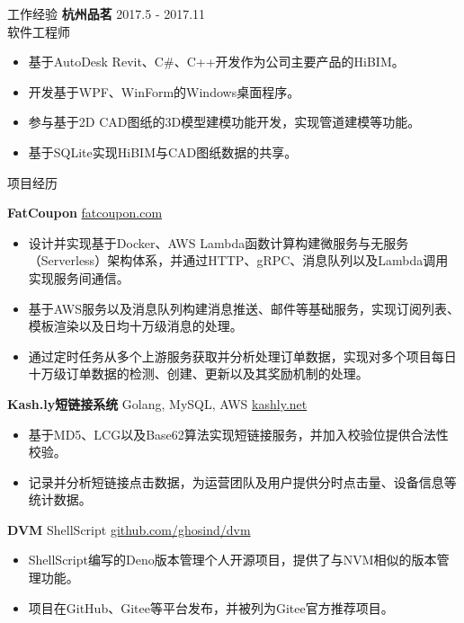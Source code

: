 \documentclass{resume} %
\begin{document}
\begin{rSection}{工作经验}
\textbf{杭州品茗} \hfill 2017.5 - 2017.11\\
软件工程师 \hfill \textit{}
\begin{itemize}
  \itemsep -3pt {}
  \item 基于AutoDesk Revit、C\#、C++开发作为公司主要产品的HiBIM。
  \item 开发基于WPF、WinForm的Windows桌面程序。
  \item 参与基于2D CAD图纸的3D模型建模功能开发，实现管道建模等功能。
  \item 基于SQLite实现HiBIM与CAD图纸数据的共享。
\end{itemize}

\end{rSection}

\begin{rSection}{项目经历}
  \vspace{-1.25em}
  
  \item \textbf{FatCoupon} {} \hfill \href{www.fatcoupon.com}{fatcoupon.com}
  \begin{itemize}
    \itemsep -3pt {}
    \item 设计并实现基于Docker、AWS Lambda函数计算构建微服务与无服务（Serverless）架构体系，并通过HTTP、gRPC、消息队列以及Lambda调用实现服务间通信。
    \item 基于AWS服务以及消息队列构建消息推送、邮件等基础服务，实现订阅列表、模板渲染以及日均十万级消息的处理。
    \item 通过定时任务从多个上游服务获取并分析处理订单数据，实现对多个项目每日十万级订单数据的检测、创建、更新以及其奖励机制的处理。
  \end{itemize}
  
  \item \textbf{Kash.ly短链接系统} {Golang, MySQL, AWS} \hfill \href{kashly.net}{kashly.net}
  \begin{itemize}
    \itemsep -3pt {}
    \item 基于MD5、LCG以及Base62算法实现短链接服务，并加入校验位提供合法性校验。
    \item 记录并分析短链接点击数据，为运营团队及用户提供分时点击量、设备信息等统计数据。
  \end{itemize}
  
  \item \textbf{DVM} {ShellScript} \hfill \href{github.com/ghosind/dvm}{github.com/ghosind/dvm}
  \begin{itemize}
    \itemsep -3pt {}
    \item ShellScript编写的Deno版本管理个人开源项目，提供了与NVM相似的版本管理功能。
    \item 项目在GitHub、Gitee等平台发布，并被列为Gitee官方推荐项目。
  \end{itemize}
  
\end{rSection}
\end{document}

